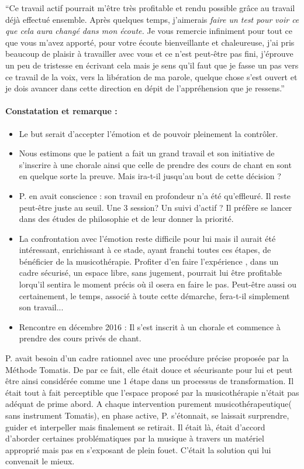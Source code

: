 ``Ce travail actif pourrait m'être très profitable et rendu possible
grâce au travail déjà effectué ensemble. Après quelques temps, j'aimerais\emph{
faire un test pour voir ce que cela aura changé dans mon écoute.}
Je vous remercie infiniment pour tout ce que vous m'avez apporté,
pour votre écoute bienveillante et chaleureuse, j'ai pris beaucoup
de plaisir à travailler avec vous et ce n'est peut-être pas fini,
j'éprouve un peu de tristesse en écrivant cela mais je sens qu'il
faut que je fasse un pas vers ce travail de la voix, vers la libération
de ma parole, quelque chose s'est ouvert et je dois avancer dans cette
direction en dépit de l'appréhension que je ressens.''

\paragraph{Constatation et remarque :}
\begin{itemize}
\item Le but serait d'accepter l'émotion et de pouvoir pleinement la contrôler. 
\item Nous estimons que le patient a fait un grand travail et son initiative
de s'inscrire à une chorale ainsi que celle de prendre des cours de
chant en sont en quelque sorte la preuve. Mais ira-t-il jusqu'au bout
de cette décision ? 
\item P. en avait conscience : son travail en profondeur n'a été qu'effleuré.
Il reste peut-être juste au seuil. Une 3\textdegree{} session? Un
suivi d'actif ? Il préfère se lancer dans des études de philosophie
et de leur donner la priorité. 
\item La confrontation avec l'émotion reste difficile pour lui mais il aurait
été intéressant, enrichissant à ce stade, ayant franchi toutes ces
étapes, de bénéficier de la musicothérapie. Profiter d'en faire l'expérience
, dans un cadre sécurisé, un espace libre, sans jugement, pourrait
lui être profitable lorqu'il sentira le moment précis où il osera
en faire le pas. Peut-être aussi ou certainement, le temps, associé
à toute cette démarche, fera-t-il simplement son travail...
\item Rencontre en décembre 2016 : Il s'est inscrit à un chorale et commence
à prendre des cours privés de chant.
\end{itemize}
P. avait besoin d'un cadre rationnel avec une procédure précise proposée
par la Méthode Tomatis. De par ce fait, elle était douce et sécurisante
pour lui et peut être ainsi considérée comme une 1\textdegree{} étape
dans un processus de transformation. Il était tout à fait perceptible
que l'espace proposé par la musicothérapie n'était pas adéquat de
prime abord. A chaque intervention purement musicothérapeutique( sans
instrument Tomatis), en phase active, P. s'étonnait, se laissait surprendre,
guider et interpeller mais finalement se retirait. Il était là, était
d'accord d'aborder certaines problématiques par la musique à travers
un matériel approprié mais pas en s'exposant de plein fouet. C'était
la solution qui lui convenait le mieux.

